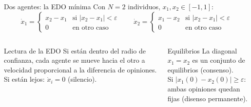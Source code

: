 \documentclass[aspectratio=169,10pt]{beamer}
\begin{document}
\begin{frame}{Dos agentes: la EDO m\'inima}
\vspace{4pt}
Con $N=2$ individuos, $x_1,x_2\in[-1,1]$:
\[
  \dot{x}_1 =
    \begin{cases}
      x_2 - x_1 & \text{si } |x_2-x_1|<\varepsilon \\
      0          & \text{en otro caso}
    \end{cases}
  \qquad
  \dot{x}_2 =
    \begin{cases}
      x_1 - x_2 & \text{si } |x_2-x_1|<\varepsilon \\
      0          & \text{en otro caso}
    \end{cases}
\]

\vspace{8pt}
\begin{columns}[T]
\begin{resultbox}{Lectura de la EDO}
Si est\'an dentro del radio de confianza,
cada agente se mueve hacia el otro a velocidad
proporcional a la diferencia de opiniones.\\[3pt]
Si est\'an lejos: $\dot{x}_i = 0$ (silencio).
\end{resultbox}

\begin{obsbox}{Equilibrios}
La diagonal $x_1=x_2$ es un conjunto de equilibrios
(consenso).\\[3pt]
Si $|x_1(0)-x_2(0)|\geq\varepsilon$: ambas opiniones
quedan fijas (disenso permanente).
\end{obsbox}
\end{columns}
\end{frame}
\end{document}
